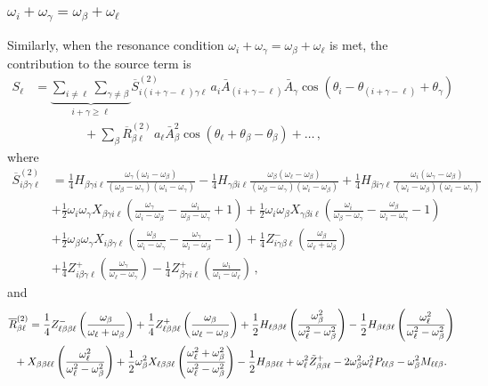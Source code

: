 \documentclass[letterpaper,11pt]{article}
\newcommand{\oi}{\omega_i}
\newcommand{\ol}{\omega_\ell}
\newcommand{\obet}{\omega_{\beta}}
\newcommand{\ogam}{\omega_\gamma}
\begin{document}
\subsubsection{$\oi + \ogam = \obet + \ol$}
\label{ssec: intpluschi2}

Similarly, when the resonance condition $\oi + \ogam = \obet + \ol$ is met, the contribution to the source term is
\begin{align}
\label{intpluschi2 source}
S_\ell &= \underbrace{\sum_{i \neq \ell} \sum_{\gamma \neq \beta}}_{i + \gamma \geq \ell} \overline{S}^{(2)}_{i (i + \gamma - \ell) \gamma \ell} \, a_i \bar A_{(i + \gamma - \ell)} \bar A_\gamma \cos \left( \theta_i - \theta_{(i + \gamma - \ell)}  + \theta_\gamma \right) \nonumber \\
%
& \qquad \qquad + \sum_\beta \overline{R}^{(2)}_{\beta\ell} \, a_\ell \bar A_\beta^2 \cos \left( \theta_\ell + \theta_\beta - \theta_\beta \right) + \ldots \, ,
\end{align}
where
\begin{align}
\overline{S}^{(2)}_{i\beta\gamma\ell} &= \frac{1}{4} H_{\beta\gamma i\ell} \frac{\ogam (\oi - \obet)}{(\obet - \ogam)(\oi - \ogam)} - \frac{1}{4} H_{\gamma\beta i \ell} \frac{\obet(\ol - \obet)}{(\obet - \ogam)(\oi - \obet)} + \frac{1}{4} H_{\beta i \gamma\ell} \frac{\oi (\ogam - \obet)}{(\oi - \obet)(\oi - \ogam)} \nonumber \\
%
& + \frac{1}{2} \oi \ogam X_{\beta\gamma i \ell} \left( \frac{\ogam}{\oi - \obet} - \frac{\oi}{\obet - \ogam} + 1 \right) + \frac{1}{2} \oi \obet X_{\gamma\beta i \ell} \left( \frac{\oi}{\obet - \ogam} - \frac{\obet}{\oi - \ogam} - 1 \right) \nonumber \\
%
& + \frac{1}{2} \obet \ogam X_{i\beta\gamma\ell} \left( \frac{\obet}{\oi - \ogam} - \frac{\ogam}{\oi - \obet} - 1 \right)  + \frac{1}{4} Z^-_{i\gamma\beta\ell} \left( \frac{\obet}{\ol + \obet}\right)  \nonumber \\
%
&
+ \frac{1}{4} Z^+_{i\beta\gamma\ell} \left( \frac{\ogam}{\ol - \ogam}\right) - \frac{1}{4}Z^+_{\beta\gamma i \ell} \left( \frac{\oi}{\oi - \ol} \right) \, ,
\end{align}
and
\begin{align}
\overline{R}^{(2)}_{\beta\ell} &= \frac{1}{4} Z^-_{\ell\beta\beta\ell} \left( \frac{\obet}{\ol + \obet} \right) + \frac{1}{4} Z^+_{\ell\beta\beta\ell} \left( \frac{\obet}{\ol - \obet} \right) + \frac{1}{2} H_{\ell\beta\beta\ell} \left( \frac{\obet^2}{\ol^2 - \obet^2} \right) - \frac{1}{2} H_{\beta\ell\beta\ell} \left( \frac{\ol^2}{\ol^2 - \obet^2} \right) \nonumber \\
%
& \!\!\!\!\!\!\!\! + X_{\beta\beta\ell\ell} \left( \frac{\ol^2}{\ol^2 - \obet^2} \right) + \frac{1}{2} \obet^2 X_{\ell\beta\beta\ell} \left( \frac{\ol^2 + \obet^2}{\ol^2 - \obet^2} \right) - \frac{1}{2} H_{\beta\beta\ell\ell} +  \ol^2 \tilde{Z}^+_{\beta\beta\ell} - 2 \obet^2 \ol^2 P_{\ell\ell\beta} - \obet^2 M_{\ell\ell\beta} . \vspace{-0.3in}
\end{align}
\end{document}
